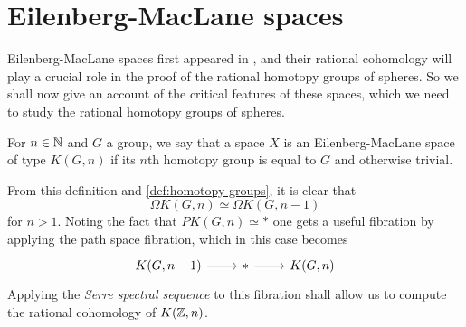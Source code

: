 \documentclass[../main.tex]{subfiles}
\begin{document}
\section{Eilenberg-MacLane spaces}
Eilenberg-MacLane spaces first appeared in \cite[]{EiMa}, and their rational
cohomology will play a crucial role in the  
proof of the rational homotopy groups of spheres. So we shall now
give an account of the critical features of these spaces, which we need
to study the rational homotopy groups of spheres.
\begin{definition}
   For \( n\in \mathbb{N} \) and \( G \) a group, we say that a space \( X \) 
   is an Eilenberg-MacLane space of type \( K(G, n) \) if its \( n \)th homotopy group is equal
   to \( G \) and otherwise trivial.
\end{definition}
From this definition and \cref{def:homotopy-groups}, it is clear that
\[ \Omega K(G,n)\simeq \Omega K(G, n-1) \] for \( n>1 \). Noting the fact that
\( PK(G, n)\simeq * \) one gets a useful fibration by applying the
path space fibration, which in this case becomes
\begin{equation}
   \begin{tikzcd}
	{K(G,n-1)} & {*} & {K(G,n)}
	\arrow[from=1-1, to=1-2]
	\arrow[from=1-2, to=1-3]
   \end{tikzcd}
\end{equation}
Applying the \emph{Serre spectral sequence} to this fibration
shall allow us to compute the rational cohomology of \( K(\mathbb{Z}, n) \).
\end{document}
